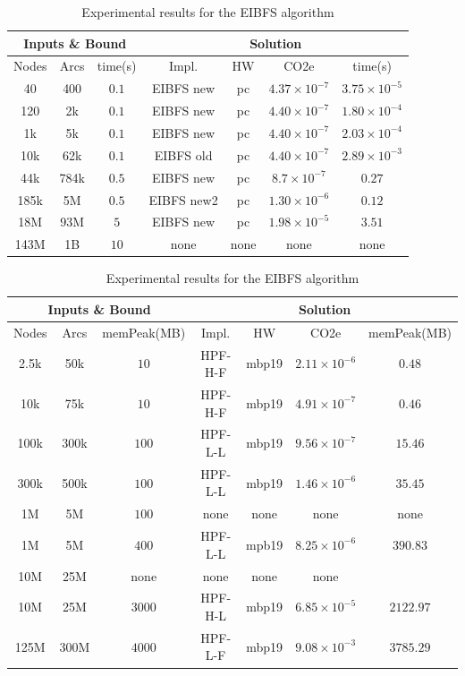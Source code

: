 \documentclass[a4paper,singleside,12pt]{report} %
\begin{document}
\begin{table}[h!]
    \centering
    \begin{tabular}{|ccc|cccc|}
        \hline
        \multicolumn{3}{|c|}{Inputs \& Bound} & \multicolumn{4}{c|}{Solution} \\
        \hline
        Nodes & Arcs & time(s) & Impl. & HW & CO2e & time(s) \\
        \hline
        40 & 400 & $0.1$ & EIBFS new & pc & $4.37 \times 10^{-7}$ & $3.75 \times 10^{-5}$ \\
        120 & 2k & $0.1$ & EIBFS new & pc & $4.40 \times 10^{-7}$ & $1.80 \times 10^{-4}$ \\
        1k & 5k & $0.1$ & EIBFS new & pc & $4.40 \times 10^{-7}$ & $2.03 \times 10^{-4}$ \\
        10k & 62k & $0.1$ & EIBFS old & pc & $4.40 \times 10^{-7}$ & $2.89 \times 10^{-3}$ \\
        44k & 784k & $0.5$ & EIBFS new & pc & $8.7 \times 10^{-7}$ & $0.27$ \\
        185k & 5M & $0.5$ & EIBFS new2 & pc & $1.30 \times 10^{-6}$ & $0.12$ \\
        18M & 93M & $5$ & EIBFS new & pc & $1.98 \times 10^{-5}$& $3.51$ \\
        143M & 1B & $10$ & none & none & none & none \\
        \hline
    \end{tabular}
    \caption{Experimental results for the EIBFS algorithm}
    \label{tab:eibfs_results}
\end{table}

\begin{table}[h!]
    \centering
    \begin{tabular}{|ccc|cccc|}
        \hline
        \multicolumn{3}{|c|}{Inputs \& Bound} & \multicolumn{4}{c|}{Solution} \\
        \hline
        Nodes & Arcs & memPeak(MB) & Impl. & HW & CO2e & memPeak(MB) \\
        \hline
        2.5k & 50k & $10$ & HPF-H-F & mbp19 & $2.11 \times 10^{-6}$ & $0.48$ \\
        10k & 75k & $10$ & HPF-H-F & mbp19 & $4.91 \times 10^{-7}$ & $0.46$ \\
        100k & 300k & $100$ & HPF-L-L & mbp19 & $9.56 \times 10^{-7}$ & $15.46$ \\
        300k & 500k & $100$ & HPF-L-L & mbp19 & $1.46 \times 10^{-6}$ & $35.45$ \\
        1M & 5M & $100$ & none & none & none & none \\
        1M & 5M & $400$ & HPF-L-L & mpb19 & $8.25 \times 10^{-6}$ & $390.83$ \\
        10M & 25M & none & none & none & none \\
        10M & 25M & $3000$ & HPF-H-L & mbp19 & $6.85 \times 10^{-5}$ & $2122.97$ \\
        125M & 300M & $4000$ & HPF-L-F & mbp19 & $9.08 \times 10^{-3}$ & $3785.29$ \\
        \hline
    \end{tabular}
    \caption{Experimental results for the EIBFS algorithm}
    \label{tab:hpf_results}
\end{table}
\end{document}
